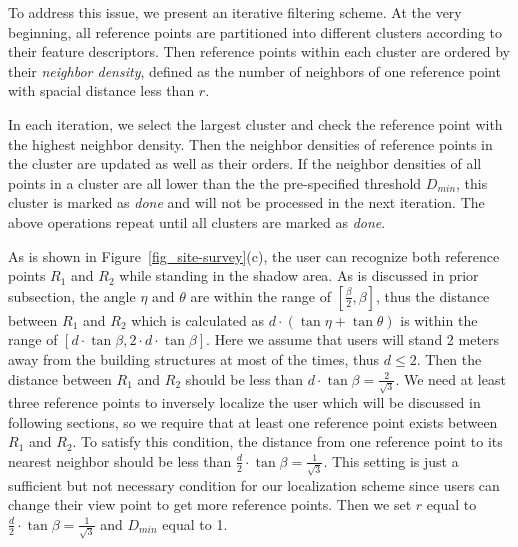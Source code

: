 \documentclass[10pt, conference, letterpaper]{IEEEtran}
\begin{document}
To address this issue, we present an iterative filtering scheme. At the very beginning, all reference points are partitioned into different clusters according to their feature descriptors. Then reference points within each cluster are ordered by their \emph{neighbor density}, defined as the number of neighbors of one reference point with spacial distance less than $r$.

In each iteration, we select the largest cluster and check the reference point with the highest neighbor density.
Then the neighbor densities of reference points in the cluster are updated as well as their orders. If the neighbor densities of all points in a cluster are all lower than the the pre-specified threshold $D_{min}$, this cluster is marked as \emph{done} and will not be processed in the next iteration.
The above operations repeat until all clusters are marked as \emph{done}.

As is shown in Figure~\ref{fig_site-survey}(c), the user can recognize both reference points $R_1$ and $R_2$ while standing in the shadow area. As is discussed in prior subsection, the angle $\eta$ and $\theta$ are within the range of $[\frac{\beta}{2}, \beta]$, thus the distance between $R_1$ and $R_2$ which is calculated as $d \cdot (\tan{\eta} + \tan{\theta})$ is within the range of $[d \cdot \tan{\beta}, 2 \cdot d \cdot \tan{\beta}]$. Here we assume that users will stand 2 meters away from the building structures at most of the times, thus $d \leq 2$. Then the distance between $R_1$ and $R_2$ should be less than $d \cdot \tan{\beta} = \frac{2}{\sqrt{3}}$. We need at least three reference points to inversely localize the user which will be discussed in following sections, so we require that at least one reference point exists between $R_1$ and $R_2$. To satisfy this condition, the distance from one reference point to its nearest neighbor should be less than $\frac{d}{2} \cdot \tan{\beta} = \frac{1}{\sqrt{3}}$. This setting is just a sufficient but not necessary condition for our localization scheme since users can change their view point to get more reference points. Then we set $r$ equal to $\frac{d}{2} \cdot \tan{\beta} = \frac{1}{\sqrt{3}}$ and $D_{min}$ equal to 1.



\end{document}
